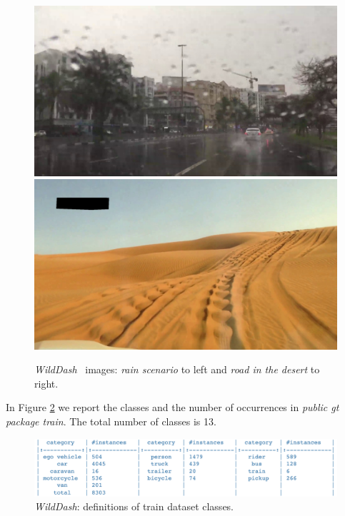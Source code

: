 \documentclass[10pt,twocolumn,letterpaper]{article}
\begin{document}
\begin{figure}[H]
\centering
\includegraphics[width=0.4\linewidth]{./image/wd_rain.jpg} \quad \includegraphics[width=0.4\linewidth]{./image/wd_desert.jpg}
\caption{\textit{WildDash}~\cite{wildDash} images: \textit{rain scenario} to left and \textit{road in the desert} to right.}
 \label{fig:image_wd}
\noindent
\end{figure}
In Figure \ref{fig:class_definitions_wd} we report the classes and the number of occurrences in \textit{public gt package train}. The total number of classes is 13.
\begin{figure}[H]
\centering
  \includegraphics[width=0.95\linewidth]{./image/wd_class} 
  \caption{\textit{WildDash}: definitions of train dataset classes.} %
  \label{fig:class_definitions_wd}
\noindent
\end{figure}
\end{document}
